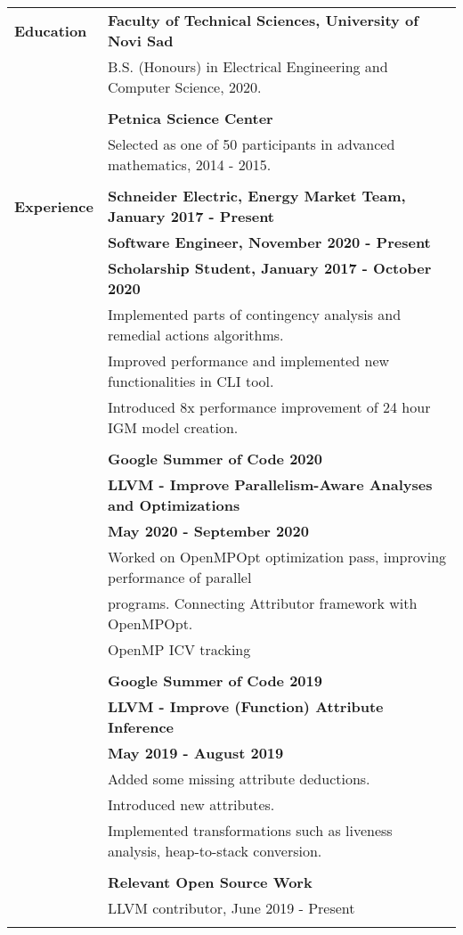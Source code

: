 \documentclass[letterpaper,11pt,oneside]{article}
\begin{document}
\noindent \begin{tabular}{@{} l l}
 \Large\textbf{Education}     & \textbf{Faculty of Technical Sciences, University of Novi Sad} \\
     & B.S. (Honours) in Electrical Engineering and Computer Science, 2020. \\ \\
     & \textbf{Petnica Science Center } \\
     & Selected as one of 50 participants in advanced mathematics, 2014 - 2015. \\ \\
 
 \Large\textbf{Experience}
     & \textbf{Schneider Electric, Energy Market Team, January 2017 - Present} \\
     & \textbf{Software Engineer, November 2020 - Present} \\
     & \textbf{Scholarship Student, January 2017 - October 2020} \\
     & Implemented parts of contingency analysis and remedial actions algorithms. \\
     & Improved performance and implemented new functionalities in CLI tool. \\
     & Introduced 8x performance improvement of 24 hour IGM model creation. \\
     & \\
     & \textbf{Google Summer of Code 2020} \\
     & \textbf{LLVM - Improve Parallelism-Aware Analyses and Optimizations } \\
     & \textbf{May 2020 - September 2020} \\
     & Worked on OpenMPOpt optimization pass, improving performance of parallel \\
     & programs. Connecting Attributor framework with OpenMPOpt. \\
     & OpenMP ICV tracking\\
     &\\
     &\textbf{Google Summer of Code 2019} \\
     & \textbf{LLVM - Improve (Function) Attribute Inference } \\
     & \textbf{May 2019 - August 2019} \\
     & Added some missing attribute deductions. \\
     & Introduced new attributes. \\
     & Implemented transformations such as liveness analysis, heap-to-stack conversion. \\
     & \\
     & \textbf{Relevant Open Source Work} \\
     & LLVM contributor, June 2019 - Present \\
     & \\
     

\end{tabular}
\end{document}
